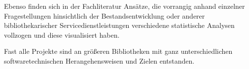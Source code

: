 Ebenso finden sich in der Fachliteratur Ansätze, die vorrangig anhand einzelner
Fragestellungen hinsichtlich der Bestandsentwicklung\cite{hughes_long-term_2016} oder anderer
bibliothekarischer Servicedienstleistungen\cite{kutlay_shiny_2020, knievel_use_2006,meyer_using_2018} verschiedene statistische Analysen
vollzogen und diese visualisiert haben.


Fast alle Projekte sind an größeren
Bibliotheken mit ganz unterschiedlichen softwaretechnischen
Herangehensweisen\cite{finch_using_2016, wiegand_visualizing_2013} und Zielen\cite{phetteplace_effectively_2012} entstanden.





